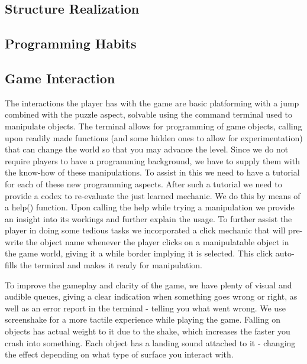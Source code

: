 \documentclass[a4paper,twoside,12pt]{article}
\begin{document}
\subsection{Structure Realization}



\subsection{Programming Habits}

\subsection{Game Interaction}
The interactions the player has with the game are basic platforming with a jump combined with the puzzle aspect, solvable using the command terminal used to manipulate objects. The terminal allows for programming of game objects, calling upon readily made functions (and some hidden ones to allow for experimentation) that can change the world so that you may advance the level. Since we do not require players to have a programming background, we have to supply them with the know-how of these manipulations. To assist in this we need to have a tutorial for each of these new programming aspects. After such a tutorial we need to provide a codex to re-evaluate the just learned mechanic. We do this by means of a help() function. Upon calling the help while trying a manipulation we provide an insight into its workings and further explain the usage. To further assist the player in doing some tedious tasks we incorporated a click mechanic that will pre-write the object name whenever the player clicks on a manipulatable object in the game world, giving it a while border implying it is selected. This click auto-fills the terminal and makes it ready for manipulation.

To improve the gameplay and clarity of the game, we have plenty of visual and audible queues, giving a clear indication when something goes wrong or right, as well as an error report in the terminal - telling you what went wrong. We use screenshake for a more tactile experience while playing the game. Falling on objects has actual weight to it due to the shake, which increases the faster you crash into something. Each object has a landing sound attached to it - changing the effect depending on what type of surface you interact with.
\end{document}
